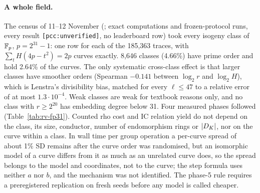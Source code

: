 \paragraph{A whole field.} The census of 11--12 November
(; exact computations and
frozen-protocol runs, every result \texttt{[pcc:unverified]}, no
leaderboard row) took every isogeny class of $\mathbb{F}_p$, $p=2^{31}-1$: one row
for each of the 185{,}363 traces, with $\sum_tH(4p-t^2)=2p$ curves exactly.
8{,}646 classes (4.66\%) have prime order and hold 2.64\% of the curves.
The only systematic cross-class effect is that larger classes have smoother
orders (Spearman $-0.141$ between $\log_2r$ and $\log_2H$), which is
Lenstra's divisibility bias, matched for every $\ell\le47$ to a relative
error of at most $1.3\cdot10^{-4}$. Weak classes are weak for textbook
reasons only, and no class with $r\ge2^{20}$ has embedding degree below 31.
Four measured phases followed (Table~\ref{tab:rv-fp31}). Counted rho cost
and IC relation yield do not depend on the class, its size, conductor,
number of endomorphism rings or $\lvert D_K \rvert$, nor on the curve within a
class. In wall time per group operation a per-curve spread of about 1\% SD
remains after the curve order was randomised, but an isomorphic model of a
curve differs from it as much as an unrelated curve does, so the spread
belongs to the model and coordinates, not to the curve; the step formula
uses neither $a$ nor $b$, and the mechanism was not identified. The phase-5
rule requires a preregistered replication on fresh seeds before any model
is called cheaper.

